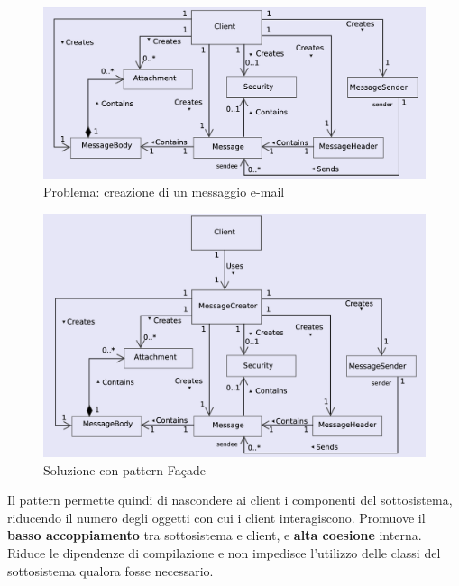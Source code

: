 \begin{figure}[H]
    \centering
    \includegraphics[width=1\linewidth]{assets/pattern/facade/facade-problema.png}
    \caption{Problema: creazione di un messaggio e-mail}
\end{figure}

\begin{figure}[H]
    \centering
    \includegraphics[width=1\linewidth]{assets/pattern/facade/facade-soluzione.png}
    \caption{Soluzione con pattern Façade}
\end{figure}

Il pattern permette quindi di nascondere ai client i componenti del sottosistema, riducendo il numero degli oggetti con cui i client interagiscono. Promuove il \textbf{basso accoppiamento} tra sottosistema e client, e \textbf{alta coesione} interna. Riduce le dipendenze di compilazione e non impedisce l'utilizzo delle classi del sottosistema qualora fosse necessario.

\newpage